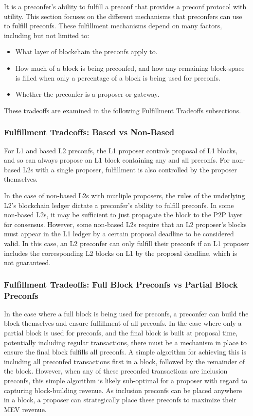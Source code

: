 \documentclass[a4paper]{article}
\theoremstyle{boldstyle}
\begin{document}
It is a preconfer's ability to fulfill a preconf that provides a preconf protocol with utility. This section focuses on the different mechanisms that preconfers can use to fulfill preconfs. These fulfillment mechanisms depend on many factors, including but not limited to:
\begin{itemize}
    \item What layer of blockchain the preconfs apply to.
    \item How much of a block is being preconfed, and how any remaining block-space is filled when only a percentage of a block is being used for preconfs.
    \item Whether the preconfer is a proposer or gateway.
\end{itemize} 
These tradeoffs are examined in the following Fulfillment Tradeoffs subsections.

\subsubsection{Fulfillment Tradeoffs: Based vs Non-Based}

For L1 and based L2 preconfs, the L1 proposer controls proposal of L1 blocks, and so can always propose an L1 block containing any and all preconfs. For non-based L2s with a single proposer, fulfillment is also controlled by the proposer themselves. 

In the case of non-based L2s with mutliple proposers, the rules of the underlying L2's blockchain ledger dictate a preconfer's ability to fulfill preconfs. In some non-based L2s, it may be sufficient to just propagate the block to the P2P layer for consensus. However, some non-based L2s require that an L2 proposer's blocks must appear in the L1 ledger by a certain proposal deadline to be considered valid. In this case, an L2 preconfer can only fulfill their preconfs if an L1 proposer includes the corresponding L2 blocks on L1 by the proposal deadline, which is not guaranteed. 

\subsubsection{Fulfillment Tradeoffs: Full Block Preconfs vs Partial Block Preconfs}

In the case where a full block is being used for preconfs, a preconfer can build the block themselves and ensure fulfillment of all preconfs. In the case where only a partial block is used for preconfs, and the final block is built at proposal time, potentially including regular transactions, there must be a mechanism in place to ensure the final block fulfills all preconfs. A simple algorithm for achieving this is including all preconfed transactions first in a block, followed by the remainder of the block. However, when any of these preconfed transactions are inclusion preconfs, this simple algorithm is likely sub-optimal for a proposer with regard to capturing block-building revenue. As inclusion preconfs can be placed anywhere in a block, a proposer can strategically place these preconfs to maximize their MEV revenue. 
\end{document}
